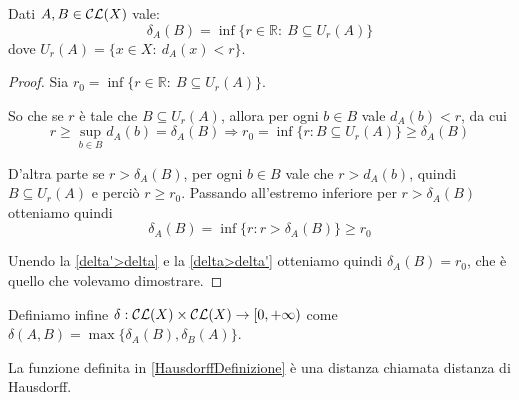 \begin{lemma}
	Dati $A,B\in \mathcal{CL}(X)$ vale:
	\begin{equation*}
		\delta_A(B)=\inf\{r\in\mathbb{R}:\ B\subseteq U_r(A)\}
	\end{equation*}
	dove $U_r(A)=\{x\in X :\ d_A(x)<r \}$.
\end{lemma}
\begin{proof}
	Sia $r_0=\inf\{r\in\mathbb{R}:\ B\subseteq U_r(A)\}$.
	
	So che se $r$ è tale che $B\subseteq U_r(A)$, allora per ogni $b\in B$ vale $d_A(b)<r$, da cui
	\begin{equation}\label{delta'>delta}
		r\ge \sup_{b\in B} d_A(b)=\delta_A(B) \Longrightarrow r_0=\inf\{r:B\subseteq U_r(A) \}\ge \delta_A(B)
	\end{equation}
	
	D'altra parte se $r>\delta_A(B)$, per ogni $b\in B$ vale che $r>d_A(b)$, quindi $B\subseteq U_r(A)$ e perciò $r\ge r_0$. Passando all'estremo inferiore per $r>\delta_A(B)$ otteniamo quindi
	\begin{equation}\label{delta>delta'}
		\delta_A(B)=\inf\{r:r>\delta_A(B)\}\ge r_0
	\end{equation}
	
	Unendo la \cref{delta'>delta} e la \cref{delta>delta'} otteniamo quindi $\delta_A(B)=r_0$, che è quello che volevamo dimostrare.
\end{proof}




\begin{definition}\label{HausdorffDefinizione}
	Definiamo infine $\delta:\mathcal{CL}(X)\times \mathcal{CL}(X) \to [0,+\infty)$ come $\delta(A,B)=\max\{ \delta_A(B),\delta_B(A) \}$.
\end{definition}

\begin{theorem}
	La funzione definita in \cref{HausdorffDefinizione} è una distanza chiamata distanza di Hausdorff.
\end{theorem}

